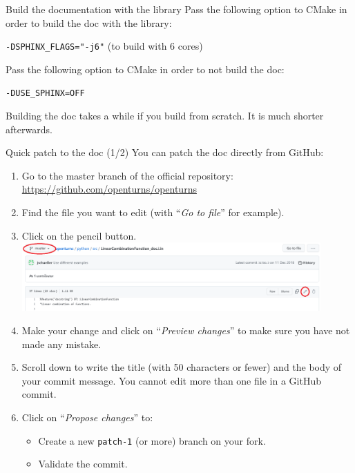 \documentclass[8pt, handout]{beamer}
\begin{document}
\begin{frame}{Build the documentation with the library}
    Pass the following option to \alert{CMake} in order to build the doc with the library:
    
    \texttt{-DSPHINX\_FLAGS="-j6"} (to build with 6 cores)

    Pass the following option to \alert{CMake} in order to \alert{not} build the doc:
    
    \texttt{-DUSE\_SPHINX=OFF}

    Building the doc takes a while if you build from scratch. It is much shorter afterwards.
\end{frame}



\begin{frame}{Quick patch to the doc (1/2)}
You can patch the doc directly from GitHub:

\begin{enumerate}
    \item Go to the \alert{master} branch of the official repository: \url{https://github.com/openturns/openturns}
    \item Find the file you want to edit (with ``\alert{\emph{Go to file}}'' for example).
    \item Click on the pencil button.
    \includegraphics[width=0.9\textwidth]{Github_edit}
    \item Make your change and click on ``\alert{\emph{Preview changes}}'' to make sure you have not made any mistake.
    \item Scroll down to write the title (with \alert{50 characters or fewer}) and the body of your commit message. You \alert{cannot edit more than one file} in a GitHub commit.
    \item Click on ``\alert{\emph{Propose changes}}'' to:
    \begin{itemize}
        \item Create a new \texttt{patch-1} (or more) branch on your fork.
        \item Validate the commit.
    \end{itemize}
    \setcounter{enumindex}{\value{enumi}}
\end{enumerate}
\end{frame}
\end{document}
